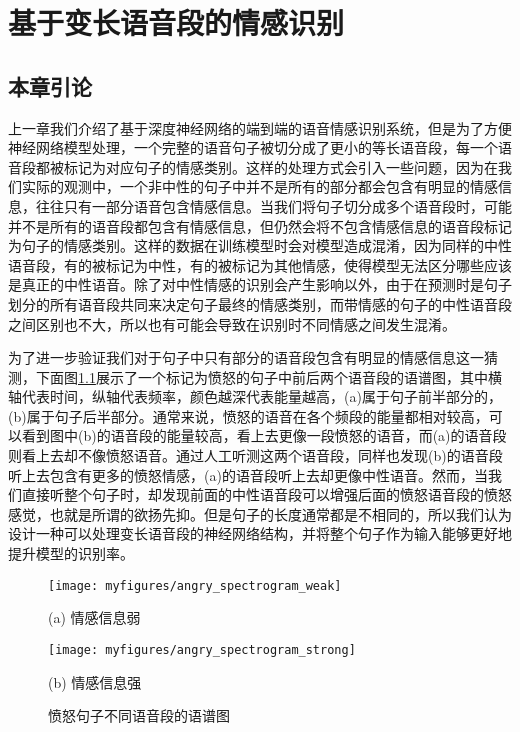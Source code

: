 \chapter{基于变长语音段的情感识别}
\label{cha:var_len}

\section{本章引论}
\label{sec:var_len_intro}

上一章我们介绍了基于深度神经网络的端到端的语音情感识别系统，但是为了方便神经网络模型处理，一个完整的语音句子被切分成了更小的等长语音段，每一个语音段都被标记为对应句子的情感类别。这样的处理方式会引入一些问题，因为在我们实际的观测中，一个非中性的句子中并不是所有的部分都会包含有明显的情感信息，往往只有一部分语音包含情感信息。当我们将句子切分成多个语音段时，可能并不是所有的语音段都包含有情感信息，但仍然会将不包含情感信息的语音段标记为句子的情感类别。这样的数据在训练模型时会对模型造成混淆，因为同样的中性语音段，有的被标记为中性，有的被标记为其他情感，使得模型无法区分哪些应该是真正的中性语音。除了对中性情感的识别会产生影响以外，由于在预测时是句子划分的所有语音段共同来决定句子最终的情感类别，而带情感的句子的中性语音段之间区别也不大，所以也有可能会导致在识别时不同情感之间发生混淆。

为了进一步验证我们对于句子中只有部分的语音段包含有明显的情感信息这一猜测，下面图\ref{fig:angry_spectrogram}展示了一个标记为愤怒的句子中前后两个语音段的语谱图，其中横轴代表时间，纵轴代表频率，颜色越深代表能量越高，(a)属于句子前半部分的，(b)属于句子后半部分。通常来说，愤怒的语音在各个频段的能量都相对较高，可以看到图中(b)的语音段的能量较高，看上去更像一段愤怒的语音，而(a)的语音段则看上去却不像愤怒语音。通过人工听测这两个语音段，同样也发现(b)的语音段听上去包含有更多的愤怒情感，(a)的语音段听上去却更像中性语音。然而，当我们直接听整个句子时，却发现前面的中性语音段可以增强后面的愤怒语音段的愤怒感觉，也就是所谓的欲扬先抑。但是句子的长度通常都是不相同的，所以我们认为设计一种可以处理变长语音段的神经网络结构，并将整个句子作为输入能够更好地提升模型的识别率。

\begin{figure}[htb]
\begin{minipage}{0.48\textwidth}
    \centering
    \texttt{[image: myfigures/angry\_spectrogram\_weak]}
    \centerline{(a) 情感信息弱}\medskip
\end{minipage}\hfill
\begin{minipage}{0.48\textwidth}
    \centering
    \texttt{[image: myfigures/angry\_spectrogram\_strong]}
    \centerline{(b) 情感信息强}\medskip
\end{minipage}
\caption{愤怒句子不同语音段的语谱图}
\label{fig:angry_spectrogram}
\end{figure}

